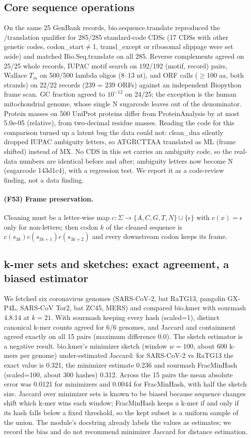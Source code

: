 \subsection{Core sequence operations}
On the same 25 GenBank records, bio.sequence.translate reproduced the /translation qualifier for 285/285 standard-code CDSs (17 CDSs with other genetic codes, codon\_start$\ne$1, transl\_except or ribosomal slippage were set aside) and matched Bio.Seq.translate on all 285. Reverse complements agreed on 25/25 whole records, IUPAC motif search on 192/192 (motif, record) pairs, Wallace $T_m$ on 500/500 lambda oligos (8--13 nt), and ORF calls ($\ge$100 aa, both strands) on 22/22 records (239 = 239 ORFs) against an independent Biopython frame scan. GC fraction agreed to $10^{-12}$ on 24/25; the exception is the human mitochondrial genome, whose single N sugarcode leaves out of the denominator. Protein masses on 500 UniProt proteins differ from ProteinAnalysis by at most 5.0e-05 (relative), from two-decimal residue masses.
Reading the code for this comparison turned up a latent bug the data could not: clean\_dna silently dropped IUPAC ambiguity letters, so ATGRCTTAA translated as ML (frame shifted) instead of MX. No CDS in this set carries an ambiguity code, so the real-data numbers are identical before and after; ambiguity letters now become N (sugarcode 143d1c4), with a regression test. We report it as a code-review finding, not a data finding.
\paragraph{(F53) Frame preservation.} Cleaning must be a letter-wise map $c:\Sigma\to\{A,C,G,T,N\}\cup\{\epsilon\}$ with $c(x)=\epsilon$ only for non-letters; then codon $k$ of the cleaned sequence is $c(s_{3k})c(s_{3k+1})c(s_{3k+2})$ and every downstream codon keeps its frame.
\subsection{k-mer sets and sketches: exact agreement, a biased estimator}
We fetched six coronavirus genomes (SARS-CoV-2, bat RaTG13, pangolin GX-P4L, SARS-CoV Tor2, bat ZC45, MERS) and compared bio.kmer with sourmash 4.8.14 at $k=21$. With sourmash keeping every hash (scaled=1), distinct canonical k-mer counts agreed for 6/6 genomes, and Jaccard and containment agreed exactly on all 15 pairs (maximum difference 0.0).
The sketch estimator is a negative result. bio.kmer's minimizer sketch (window $w=100$, about 600 k-mers per genome) under-estimated Jaccard: for SARS-CoV-2 vs RaTG13 the exact value is 0.321, the minimizer estimate 0.236 and sourmash FracMinHash (scaled=100, about 300 hashes) 0.312. Across the 15 pairs the mean absolute error was 0.0121 for minimizers and 0.0044 for FracMinHash, with half the sketch size. Jaccard over minimizer sets is known to be biased because sequence changes shift which k-mer wins each window; FracMinHash keeps a k-mer if and only if its hash falls below a fixed threshold, so the kept subset is a uniform sample of the union. The module's docstring already labels the values as estimates; we record the bias and do not recommend minimizer Jaccard for distance estimation.
